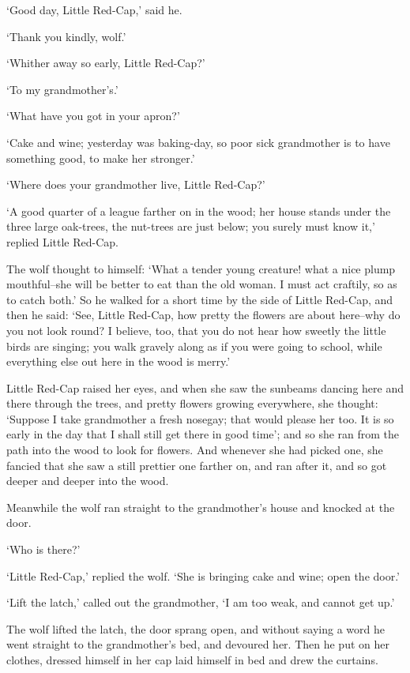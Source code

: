 \documentclass[oneside,11pt]{book} %
\begin{document}
`Good day, Little Red-Cap,' said he.

`Thank you kindly, wolf.'

`Whither away so early, Little Red-Cap?'

`To my grandmother's.'

`What have you got in your apron?'

`Cake and wine; yesterday was baking-day, so poor sick grandmother is to have something good, to make her stronger.'

`Where does your grandmother live, Little Red-Cap?'

`A good quarter of a league farther on in the wood; her house stands under the three large oak-trees, the nut-trees are just below; you surely must know it,' replied Little Red-Cap.

The wolf thought to himself: `What a tender young creature! what a nice plump mouthful--she will be better to eat than the old woman. I must act craftily, so as to catch both.' So he walked for a short time by the side of Little Red-Cap, and then he said: `See, Little Red-Cap, how pretty the flowers are about here--why do you not look round? I believe, too, that you do not hear how sweetly the little birds are singing; you walk gravely along as if you were going to school, while everything else out here in the wood is merry.'

Little Red-Cap raised her eyes, and when she saw the sunbeams dancing here and there through the trees, and pretty flowers growing everywhere, she thought: `Suppose I take grandmother a fresh nosegay; that would please her too. It is so early in the day that I shall still get there in good time'; and so she ran from the path into the wood to look for flowers. And whenever she had picked one, she fancied that she saw a still prettier one farther on, and ran after it, and so got deeper and deeper into the wood.

Meanwhile the wolf ran straight to the grandmother's house and knocked at the door.

`Who is there?'

`Little Red-Cap,' replied the wolf. `She is bringing cake and wine; open the door.'

`Lift the latch,' called out the grandmother, `I am too weak, and cannot get up.'

The wolf lifted the latch, the door sprang open, and without saying a word he went straight to the grandmother's bed, and devoured her. Then he put on her clothes, dressed himself in her cap laid himself in bed and drew the curtains.
\end{document}
